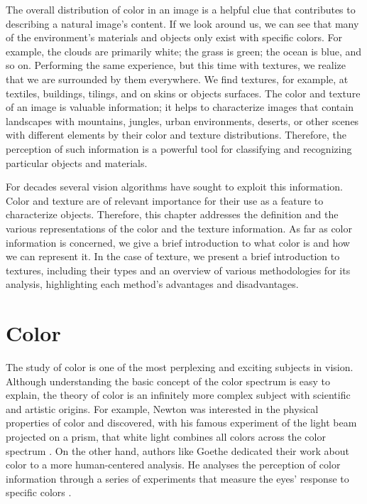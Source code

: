 The overall distribution of color in an image is a helpful clue that contributes to describing a natural image's content. If we look around us, we can see that many of the environment's materials and objects only exist with specific colors. For example, the clouds are primarily white; the grass is green; the ocean is blue, and so on. Performing the same experience, but this time with textures, we realize that we are surrounded by them everywhere. We find textures, for example, at textiles, buildings, tilings, and on skins or objects surfaces. The color and texture of an image is valuable information; it helps to characterize images that contain landscapes with mountains, jungles, urban environments, deserts, or other scenes with different elements by their color and texture distributions. Therefore, the perception of such information is a powerful tool for classifying and recognizing particular objects and materials.

For decades several vision algorithms have sought to exploit this information. Color and texture are of relevant importance for their use as a feature to characterize objects. Therefore, this chapter addresses the definition and the various representations of the color and the texture information. As far as color information is concerned, we give a brief introduction to what color is and how we can represent it. In the case of texture, we present a brief introduction to textures, including their types and an overview of various methodologies for its analysis, highlighting each method's advantages and disadvantages. 


\section{Color}
The study of color is one of the most perplexing and exciting subjects in vision. Although understanding the basic concept of the color spectrum is easy to explain, the theory of color is an infinitely more complex subject with scientific and artistic origins. For example, Newton was interested in the physical properties of color and discovered, with his famous experiment of the light beam projected on a prism, that white light combines all colors across the color spectrum \citep{Newton:Book:1704}.  On the other hand, authors like Goethe dedicated their work about color to a more human-centered analysis. He analyses the perception of color information through a series of experiments that measure the eyes' response to specific colors \citep{Goethe:Book:2015}.

